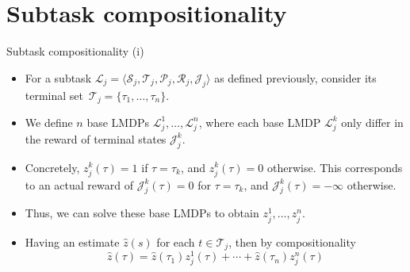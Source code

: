 \documentclass{beamer}
\theoremstyle{mystyle}
\newcommand{\cJ}{\mathcal{J}}
\newcommand{\cL}{\mathcal{L}}
\newcommand{\cP}{\mathcal{P}}
\newcommand{\cR}{\mathcal{R}}
\newcommand{\cS}{\mathcal{S}}
\newcommand{\cT}{\mathcal{T}}
\begin{document}
\section{Subtask compositionality}

\begin{frame}{Subtask compositionality (i)}

\begin{itemize}
    \item For a subtask $\cL_j=\langle\cS_j,\cT_j,\cP_j,\cR_j,\cJ_j\rangle$ as defined previously, consider its terminal set~$\cT_j=\{\tau_1,\ldots,\tau_n\}$.
    \item We define {\color{blue} $n$ base LMDPs} $\cL_j^1,\ldots,\cL_j^n$, where each base LMDP  $\cL_j^k$ only differ in the reward of terminal states $\cJ_j^k$.
    \item Concretely, $z_j^k(\tau)=1$ if $\tau=\tau_k$, and $z_j^k(\tau)=0$ otherwise. This corresponds to an actual reward of $\cJ_j^k(\tau)=0$ for $\tau=\tau_k$, and $\cJ_j^k(\tau)=-\infty$ otherwise.
    \item Thus, we can solve these {\color{blue} base LMDPs} to obtain $z_j^1,\ldots,z_j^n$.
    \item Having an estimate $\hat z(s)$ for each $t \in \cT_j$, then by compositionality
    \begin{equation*}\label{eq:comp}
        \hat{z}(\tau)=\hat{z}(\tau_1)z_j^1(\tau)+\cdots+\hat{z}(\tau_n)z_j^n(\tau)
    \end{equation*}
\end{itemize}

    
\end{frame}
\end{document}
